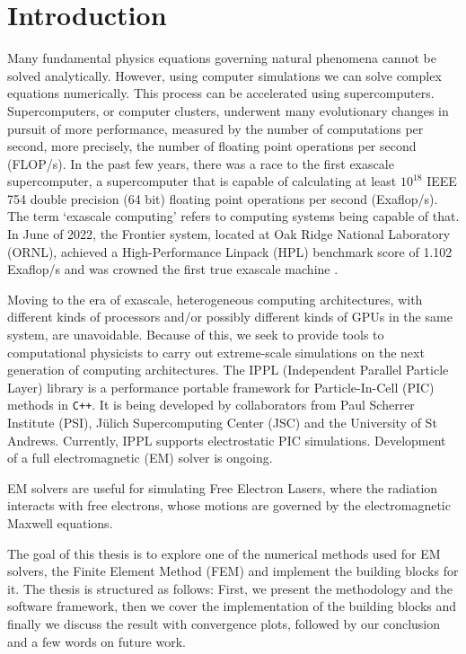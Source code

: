 
\chapter{Introduction}

Many fundamental physics equations governing natural phenomena cannot be solved analytically.
However, using computer simulations we can solve complex equations numerically.
This process can be accelerated using supercomputers.
Supercomputers, or computer clusters, underwent many evolutionary changes
in pursuit of more performance, measured by the number of computations per second,
more precisely, the number of floating point operations per second (FLOP/s).
In the past few years, there was a race to the first exascale supercomputer,
a supercomputer that is capable of calculating at least $10^{18}$ IEEE 754 double precision (64 bit) floating point
operations per second (Exaflop/s).
The term `exascale computing' refers to computing systems being capable of that.
In June of 2022, the Frontier system, located at Oak Ridge National Laboratory (ORNL),
achieved a High-Performance Linpack (HPL) benchmark score of 1.102 Exaflop/s
and was crowned the first true exascale machine \cite{noauthor_june_2023}.

Moving to the era of exascale, heterogeneous computing architectures,
with different kinds of processors and/or possibly different kinds of GPUs in the same system, are unavoidable.
Because of this, we seek to provide tools to computational physicists to carry out
extreme-scale simulations on the next generation of computing architectures.
The IPPL (Independent Parallel Particle Layer) library \cite{frey_ippl-frameworkippl_2023} is a
performance portable framework for Particle-In-Cell (PIC) methods in \texttt{C++}.
It is being developed by collaborators from Paul Scherrer Institute (PSI),
Jülich Supercomputing Center (JSC)
and the University of St Andrews.
Currently, IPPL supports electrostatic PIC simulations.
Development of a full electromagnetic (EM) solver is ongoing.

EM solvers are useful for simulating Free Electron Lasers,
where the radiation interacts with free electrons,
whose motions are governed by the electromagnetic Maxwell equations.

The goal of this thesis is to explore one of the numerical methods used for
EM solvers, the Finite Element Method (FEM) and implement the building blocks
for it. The thesis is structured as follows: First, we present the methodology
and the software framework, then we cover the implementation of the
building blocks and finally we discuss the result with convergence plots, followed by our
conclusion and a few words on future work.
